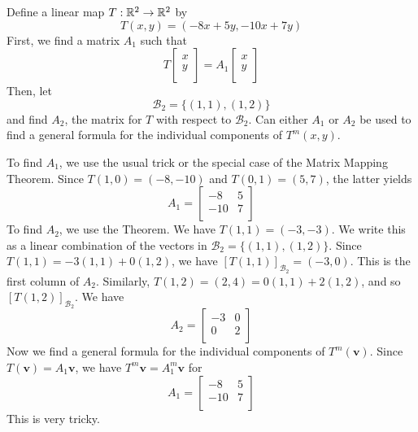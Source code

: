 \documentclass{article}
\begin{document}
\begin{example}
  Define a linear map $T: \mathbb{R}^2 \to \mathbb{R}^2$ by \[
    T(x, y) = (-8x + 5y, -10x + 7y)
  \]
  First, we find a matrix $A_1$ such that \[
    T
    \begin{bmatrix}
      x\\y\\
    \end{bmatrix} = A_1
    \begin{bmatrix}
      x\\y\\
    \end{bmatrix}
  \]
  Then, let \[
    \mathcal{B}_2 = \{(1, 1), (1, 2)\}
  \]
  and find $A_2$, the matrix for $T$ with respect to $\mathcal{B}_2$. Can either $A_1$ or $A_2$ be used to find a general formula for the individual components of $T^m(x, y)$.

  To find $A_1$, we use the usual trick or the special case of the Matrix Mapping Theorem. Since $T(1, 0) = (-8, -10)$ and $T(0, 1) = (5, 7)$, the latter yields \[
    A_1 =
    \begin{bmatrix}
      -8 & 5\\
      -10 & 7\\
    \end{bmatrix}
  \]
  To find $A_2$, we use the Theorem. We have $T(1, 1) = (-3, -3)$. We write this as a linear combination of the vectors in $\mathcal{B}_2 = \{(1, 1), (1, 2)\}$. Since $T(1, 1) = -3(1, 1) + 0(1, 2)$, we have $[T(1, 1)]_{\mathcal{B}_2} = (-3, 0)$. This is the first column of $A_2$. Similarly, $T(1, 2) = (2, 4) = 0(1, 1) + 2(1, 2)$, and so $[T(1, 2)]_{\mathcal{B}_2}$. We have \[
    A_2 =
    \begin{bmatrix}
      -3 & 0\\
      0 & 2\\
    \end{bmatrix}
  \]
  Now we find a general formula for the individual components of $T^m(\textbf{v})$. Since $T(\textbf{v}) = A_1\textbf{v}$, we have $T^m\textbf{v} = A_1^m\textbf{v}$ for \[
    A_1 =
    \begin{bmatrix}
      -8 & 5\\
      -10 & 7\\
    \end{bmatrix}
  \]
  This is very tricky.


\end{example}
\end{document}
